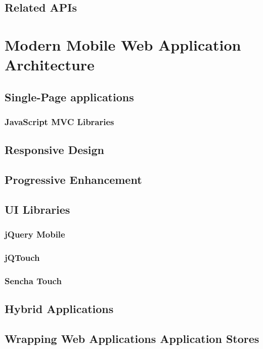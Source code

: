 \subsection{Related APIs}

\section{Modern Mobile Web Application Architecture}
\label{section:modern-mobile-web}

\subsection{Single-Page applications}
\subsubsection{JavaScript MVC Libraries}

\subsection{Responsive Design}
\subsection{Progressive Enhancement}

\subsection{UI Libraries}
\subsubsection{jQuery Mobile}
\subsubsection{jQTouch}
\subsubsection{Sencha Touch}

\subsection{Hybrid Applications}
\subsection{Wrapping Web Applications Application Stores}

